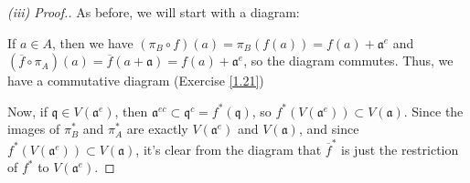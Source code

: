 \begin{proof}[(iii) Proof.]
As before, we will start with a diagram:
\begin{center}
\end{center}
If $a \in A$, then we have $(\pi_B \circ f)(a) = \pi_B(f(a)) = f(a) + \mathfrak{a}^e$ and $(\overline{f} \circ \pi_A)(a) = \overline{f}(a + \mathfrak{a}) = f(a) + \mathfrak{a}^e$, so the diagram
commutes. Thus, we have a commutative diagram (Exercise \ref{1.21})
\begin{center}
\end{center}
Now, if $\mathfrak{q} \in V(\mathfrak{a}^e)$, then $\mathfrak{a}^{ec} \subset \mathfrak{q}^c = f^*(\mathfrak{q})$, so $f^*(V(\mathfrak{a}^e))\subset V(\mathfrak{a})$. Since the images of $\pi_B^*$
and $\pi_A^*$ are exactly $V(\mathfrak{a}^e)$ and $V(\mathfrak{a})$, and since $f^*(V(\mathfrak{a}^e))\subset V(\mathfrak{a})$, it's clear from the diagram that $\overline{f}^*$ is just the restriction
of $f^*$ to $V(\mathfrak{a}^e)$.
\end{proof}

